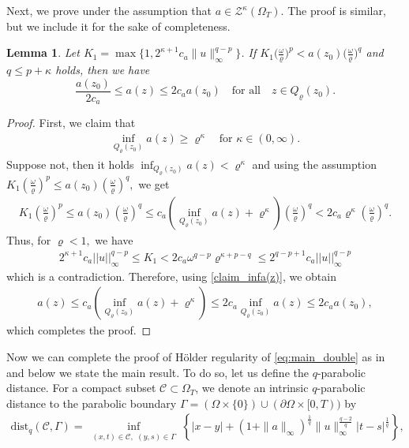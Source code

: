 \documentclass[notitlepage,11pt,reqno]{amsart}
\newtheorem{lemma}[theorem]{Lemma}
\theoremstyle{definition}
\numberwithin{equation}{section}
\begin{document}
Next, we prove \cite[Lemma 4.1 ]{Kim2025holder} under the assumption that $a\in \mathcal{Z}^{\kappa}(\Omega_T)$. The proof is similar, but we include it for the sake of completeness.
 \begin{lemma}
    Let $K_1=\max \{1, 2^{\kappa+1}c_a\|u\|_\infty^{q-p}\}$. If $K_1\bigl( \tfrac{\omega}{\varrho}\bigr)^p<a(z_0)\bigl( \tfrac{\omega}{\varrho}\bigr)^q$ and $q\leq p+\kappa$ holds, then we have
    $$
        \frac{a(z_0)}{2c_a}\le a(z)\le 2c_a a(z_0)\quad\text{for all}\quad z\in Q_{\varrho}(z_0).
    $$
\end{lemma}
\begin{proof}
First, we claim that 
\begin{align}\label{claim_infa(z)}
\inf_{Q_{\varrho}(z_0)}a(z)\geq \varrho^{\kappa}\quad  \text{for } \kappa \in (0, \infty).
\end{align} 
Suppose not, then it holds $\inf_{Q_{\varrho}(z_0)}a(z)< \varrho^{\kappa}$ and using the assumption $K_1\left(\frac{\omega}{\varrho}\right)^p\leq a(z_0)\left(\frac{\omega}{\varrho}\right)^q,$ we get
\begin{align*}
    K_1\left(\frac{\omega}{\varrho}\right)^p\leq a(z_0)\left(\frac{\omega}{\varrho}\right)^q\leq c_a\left(\inf_{Q_{\varrho}(z_0)}a(z)+\varrho^{\kappa}\right)\left(\frac{\omega}{\varrho}\right)^q< 2c_a \varrho^{\kappa}\left(\frac{\omega}{\varrho}\right)^{q}.
\end{align*}
Thus, for $\varrho<1,$ we have
\begin{align*}
    2^{\kappa+1}c_a||u||^{q-p}_{\infty} \leq K_1< 2c_{a}\omega^{q-p}\varrho^{\kappa+p-q}\leq 2^{q-p+1}c_{a}||u||^{q-p}_{\infty}
\end{align*}
which is a contradiction. Therefore, using \eqref{claim_infa(z)}, we obtain
\begin{align*}
    a(z)\leq c_a\left(\inf_{Q_{\varrho}(z_0)}a(z)+\varrho^{\kappa}\right)\leq 2c_a \inf_{Q_{\varrho}(z_0)}a(z)\leq 2c_a a(z_0),
\end{align*}
which completes the proof.
\end{proof} 
Now we can complete the proof of H\"older regularity of \eqref{eq:main_double} as in \cite{Kim2025holder} and below we state the main result. To do so, let us define the $q$-parabolic distance. For a compact subset $\mathcal{C}\subset \Omega_T$, we denote an intrinsic  $q$-parabolic distance to the parabolic boundary $ \Gamma  = (\Omega \times \{0\}) \cup (\partial \Omega \times [0,T))$ by
\begin{align*}       
\text{dist}_q(\mathcal{C},\Gamma)=\inf_{\substack{(x,t) \in \mathcal{C}, \,\, (y,s) \in \Gamma  }} \left\{ |x-y| +(1+\|a\|_\infty)^\frac{1}{q} \|u\|_\infty^{\frac{q-2}{q}} |t-s|^\frac{1}{q} \right\},
\end{align*}
 
\end{document}
